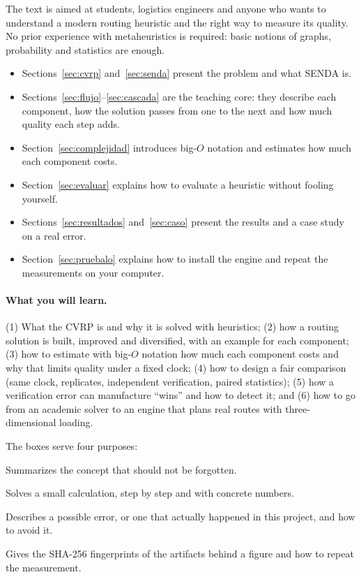 \documentclass[11pt,a4paper]{article}
\begin{document}
The text is aimed at students, logistics engineers and anyone who wants to understand a modern
routing heuristic and the right way to measure its quality. No prior experience with metaheuristics
is required: basic notions of graphs, probability and statistics are enough.

\begin{itemize}[leftmargin=1.5em]
\item Sections~\ref{sec:cvrp} and~\ref{sec:senda} present the problem and what SENDA is.
\item Sections~\ref{sec:flujo}--\ref{sec:cascada} are the teaching core: they describe each
component, how the solution passes from one to the next and how much quality each step adds.
\item Section~\ref{sec:complejidad} introduces big-$O$ notation and estimates how much each component
costs.
\item Section~\ref{sec:evaluar} explains how to evaluate a heuristic without fooling yourself.
\item Sections~\ref{sec:resultados} and~\ref{sec:caso} present the results and a case study on a real
error.
\item Section~\ref{sec:pruebalo} explains how to install the engine and repeat the measurements on
your computer.
\end{itemize}

\paragraph{What you will learn.} (1) What the CVRP is and why it is solved with heuristics; (2) how a
routing solution is built, improved and diversified, with an example for each component; (3) how to
estimate with big-$O$ notation how much each component costs and why that limits quality under a
fixed clock; (4) how to design a fair comparison (same clock, replicates, independent verification,
paired statistics); (5) how a verification error can manufacture ``wins'' and how to detect it; and
(6) how to go from an academic solver to an engine that plans real routes with three-dimensional
loading.

The boxes serve four purposes:

\begin{ideaclave}
Summarizes the concept that should not be forgotten.
\end{ideaclave}
\begin{ejemplo}
Solves a small calculation, step by step and with concrete numbers.
\end{ejemplo}
\begin{leccion}
Describes a possible error, or one that actually happened in this project, and how to avoid it.
\end{leccion}
\begin{reproducir}
Gives the SHA-256 fingerprints of the artifacts behind a figure and how to repeat the measurement.
\end{reproducir}
\end{document}
